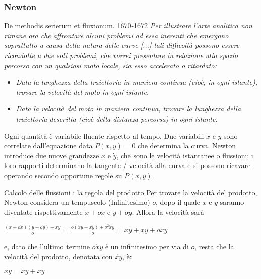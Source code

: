 \begin{frame}[label=Newton]
  \frametitle{Newton}

  \begin{block}{De methodis serierum et fluxionum. 1670-1672}
    \textit{Per illustrare l'arte analitica non rimane ora che affrontare alcuni problemi
      ad essa inerenti che emergono soprattutto a causa della natura delle curve [...]
      tali difficoltà possono essere ricondotte a due soli problemi, che vorrei presentare
      in relazione allo spazio percorso con un qualsiasi moto locale, sia esso accelerato
      o ritardato:}

    \begin{itemize}
      \item
            \textit{Data la lunghezza della traiettoria in maniera continua (cioè, in ogni istante),
              trovare la velocità del moto in ogni istante.}
      \item
            \textit{Data la velocità del moto in maniera continua, trovare la lunghezza della traiettoria
              descritta (cioè della distanza percorsa) in ogni istante.}
    \end{itemize}

    Ogni quantità è variabile \alert{fluente} rispetto al tempo. Due variabili $x$ e $y$ sono correlate 
    dall'equazione data $P(x,y)=0$ che determina la curva. 
    Newton introduce due nuove grandezze $\dot{x}$ e $\dot{y}$, che sono le velocità istantanee
    o \alert{flussioni}; i loro rapporti determinano la tangente / velocità alla curva e si possono ricavare operando
    \alert{secondo opportune regole} su $P(x,y)$.
  \end{block}
  \begin{exampleblock}{Calcolo delle flussioni : la regola del prodotto}
    Per trovare la velocità del prodotto, Newton considera un tempuscolo (Infinitesimo) $o$, dopo il quale $x$ e $y$ saranno diventate 
    rispettivamente $x+o\dot{x}$ e $y+o\dot{y}$. Allora la velocità sarà
    \begin{center}
      $\frac{(x+o\dot{x})(y+o\dot{y}) - xy}{o} = \frac{o(\dot{x}y + x\dot{y}) + o^2\dot{x}\dot{y}}{o} = \dot{x}y + x\dot{y} + o\dot{x}\dot{y}$
    \end{center}
    e, dato che l'ultimo termine $o\dot{x}\dot{y}$ è un infinitesimo per via di $o$, resta che la velocità del prodotto,
    denotata con $\dot{xy}$, è:
    \begin{center}
        $\dot{xy} = \dot{x}y + x\dot{y}$
    \end{center}

  \end{exampleblock}




\end{frame}


